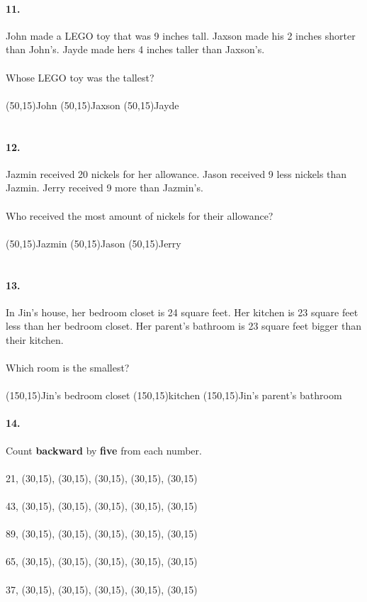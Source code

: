 \documentclass[12pt]{article}
\begin{document}
\paragraph{11.}
John made a LEGO toy that was 9 inches tall. Jaxson made his 2 inches shorter than John's. Jayde made hers 4 inches taller than Jaxson's.
\\
\\
Whose LEGO toy was the tallest?
\\
\\
\framebox(50,15){John} \framebox(50,15){Jaxson} \framebox(50,15){Jayde}
\\
\\
\paragraph{12.}
Jazmin received 20 nickels for her allowance. Jason received 9 less nickels than Jazmin. Jerry received 9 more than Jazmin's.
\\
\\
Who received the most amount of nickels for their allowance?
\\
\\
\framebox(50,15){Jazmin} \framebox(50,15){Jason} \framebox(50,15){Jerry}
\\
\\
\paragraph{13.}
In Jin's house, her bedroom closet is 24 square feet. Her kitchen is 23 square feet less than her bedroom closet. Her parent's bathroom is 23 square feet bigger than their kitchen.
\\
\\
Which room is the smallest?
\\
\\
\framebox(150,15){Jin's bedroom closet} \framebox(150,15){kitchen} \framebox(150,15){Jin's parent's bathroom}

\newpage

\paragraph{14.}
Count \textbf{backward} by \textbf{five} from each number. \\
\\
21, \framebox(30,15){}, \framebox(30,15){}, \framebox(30,15){}, \framebox(30,15){}, \framebox(30,15){}
\\
\\
43, \framebox(30,15){}, \framebox(30,15){}, \framebox(30,15){}, \framebox(30,15){}, \framebox(30,15){}
\\
\\
89, \framebox(30,15){}, \framebox(30,15){}, \framebox(30,15){}, \framebox(30,15){}, \framebox(30,15){}
\\
\\
65, \framebox(30,15){}, \framebox(30,15){}, \framebox(30,15){}, \framebox(30,15){}, \framebox(30,15){}
\\
\\
37, \framebox(30,15){}, \framebox(30,15){}, \framebox(30,15){}, \framebox(30,15){}, \framebox(30,15){}
\end{document}
